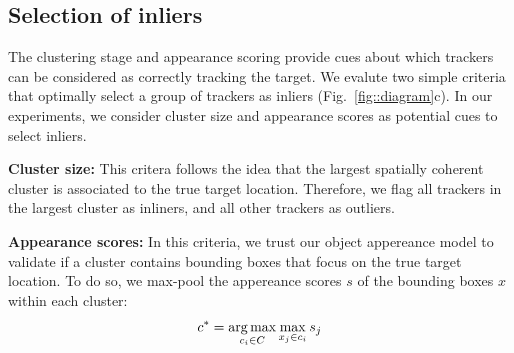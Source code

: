 \subsection{Selection of inliers}
\label{sec:inliers}
The clustering stage and appearance scoring provide cues about which trackers
can be considered as correctly tracking the target.
We evalute two simple criteria that optimally select a group of trackers as
inliers (Fig.~\ref{fig::diagram}c).
In our experiments, we consider cluster size and appearance scores as
potential cues to select inliers.


\textbf{Cluster size:}
This critera follows the idea that the largest spatially coherent cluster
is associated to the true target location. Therefore, we flag all trackers
in the largest cluster as inliners, and all other trackers as outliers.


\textbf{Appearance scores:}
In this criteria, we trust our object appereance model to validate if a cluster
contains bounding boxes that focus on the true target location.
To do so, we max-pool the appereance scores $s$ of the bounding boxes $x$ within
each cluster:
\begin{equation}
 c^{*} = \operatorname*{arg\,max}_{c_i\in C} \max_{x_j \in c_i} s_{j}
\end{equation}

